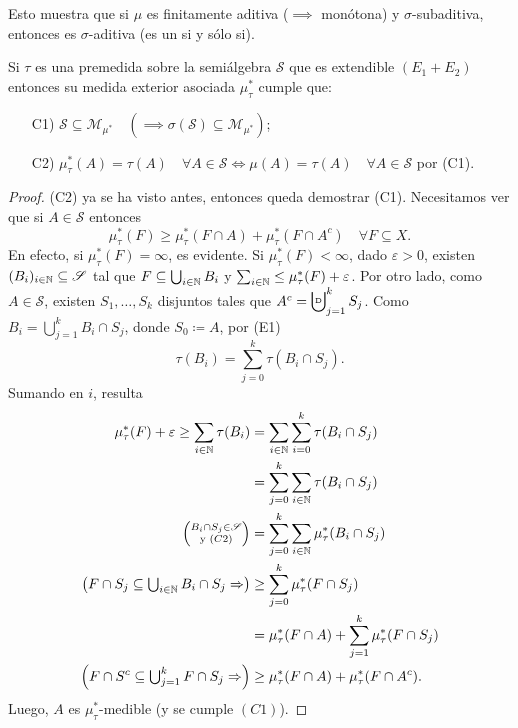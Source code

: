 \begin{observe}
	Esto muestra que si $\mu$ es finitamente aditiva ($\implies$ monótona) y $\sigma$-subaditiva, entonces es $\sigma$-aditiva (es un si y sólo si).
\end{observe}

\begin{prop}
	Si $\tau$ es una premedida sobre la semiálgebra $\mathscr{S}$ que es extendible $(E_1 + E_2)$ entonces su medida exterior asociada $\mu^{*}_{\tau}$ cumple que:
	\begin{enumerate}
		\item[C1)] $\mathscr{S} \subseteq \mathscr{M}_{\mu^*} \quad (\implies \sigma(\mathscr{S}) \subseteq \mathscr{M}_{\mu^{*}})$;

		\item[C2)] $\mu^{*}_{\tau}(A) = \tau(A) \quad \forall A \in \mathscr{S} \iff \mu(A) = \tau(A) \quad \forall A \in \mathscr{S}$ por (C1).
	\end{enumerate}
\end{prop}
\begin{proof}
	(C2) ya se ha visto antes, entonces queda demostrar (C1). Necesitamos ver que si $A \in \mathscr{S}$ entonces
	\[ \mu^{*}_{\tau}(F) \geq \mu^{*}_{\tau}(F \cap A) + \mu^{*}_{\tau}(F \cap A^c) \quad \forall F \subseteq X. \]
	En efecto, si $\mu^{*}_{\tau}(F) = \infty$, es evidente. Si $\mu^{*}_{\tau}(F) < \infty$, dado $\varepsilon > 0$, existen $(B_i)_{i\in\mathbb{N}} \subseteq \mathscr{S}$ tal que $F \subseteq \bigcup_{i\in\mathbb{N}} B_i$ y $\sum_{i\in\mathbb{N}} \leq \mu^{*}_{\tau}(F) + \varepsilon$. Por otro lado, como $A \in \mathscr{S}$, existen $S_{1},\dots,S_{k}$ disjuntos tales que $A^c = \bigcupd_{j=1}^{k} S_j$. Como $B_i = \bigcup_{j=1}^{k} B_i \cap S_j$, donde $S_0 \coloneq A$, por (E1)
	\[ \tau(B_i) = \sum_{j=0}^{k} \tau(B_i \cap S_j). \]
	Sumando en $i$, resulta
	\begin{align*}
		\mu^{*}_{\tau}(F) + \varepsilon \geq \sum_{i\in\mathbb{N}} \tau(B_i) &= \sum_{i\in\mathbb{N}}\sum_{i=0}^{k} \tau(B_i \cap S_j) \\
		&= \sum_{j=0}^{k} \sum_{i\in\mathbb{N}}\tau(B_i \cap S_j) \\
		\left(\substack{B_i \cap S_j \in \mathscr{S} \\
					\text{y } (C2)}\right) &= \sum_{j=0}^{k} \sum_{i\in\mathbb{N}} \mu^{*}_{\tau}(B_i \cap S_j) \\
		\left(F \cap S_j \subseteq \textstyle\bigcup_{i\in\mathbb{N}} B_i \cap S_j \Rightarrow\right) & \geq \sum_{j=0}^{k} \mu^{*}_{\tau}(F \cap S_j) \\
		&= \mu^{*}_{\tau}(F \cap A) + \sum_{j=1}^{k} \mu^{*}_{\tau}(F \cap S_j) \\
		\left(F \cap S^c \subseteq \textstyle\bigcup_{j=1}^{k} F \cap S_j \Rightarrow \right) & \geq \mu^{*}_{\tau}(F \cap A) + \mu^{*}_{\tau}(F \cap A^c)
	.\end{align*}
	Luego, $A$ es $\mu^{*}_{\tau}$-medible (y se cumple $(C1)$).
\end{proof}

